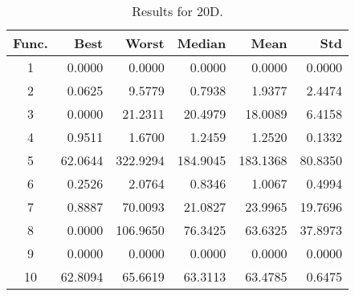\begin{table}[ht]
\centering
\caption{ Results for 20D. }
\label{tab:20D}
\begin{tabular}{crrrrr}
\hline
{Func.} & Best & Worst & Median & Mean & Std \\
\hline
1 & 0.0000 & 0.0000 & 0.0000 & 0.0000 & 0.0000 \\
2 & 0.0625 & 9.5779 & 0.7938 & 1.9377 & 2.4474 \\
3 & 0.0000 & 21.2311 & 20.4979 & 18.0089 & 6.4158 \\
4 & 0.9511 & 1.6700 & 1.2459 & 1.2520 & 0.1332 \\
5 & 62.0644 & 322.9294 & 184.9045 & 183.1368 & 80.8350 \\
6 & 0.2526 & 2.0764 & 0.8346 & 1.0067 & 0.4994 \\
7 & 0.8887 & 70.0093 & 21.0827 & 23.9965 & 19.7696 \\
8 & 0.0000 & 106.9650 & 76.3425 & 63.6325 & 37.8973 \\
9 & 0.0000 & 0.0000 & 0.0000 & 0.0000 & 0.0000 \\
10 & 62.8094 & 65.6619 & 63.3113 & 63.4785 & 0.6475 \\
\hline
\end{tabular}
\end{table}
